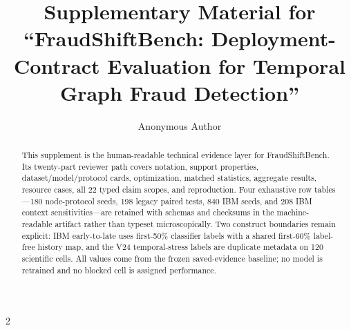 \documentclass[10pt,journal,onecolumn]{IEEEtran}
\begin{document}
\title{Supplementary Material for ``FraudShiftBench: Deployment-Contract Evaluation for Temporal Graph Fraud Detection''}
\author{Anonymous Author}
\maketitle
\pagestyle{plain}

\begin{abstract}
This supplement is the human-readable technical evidence layer for FraudShiftBench. Its twenty-part reviewer path covers notation, support properties, dataset/model/protocol cards, optimization, matched statistics, aggregate results, resource cases, all 22 typed claim scopes, and reproduction. Four exhaustive row tables---180 node-protocol seeds, 198 legacy paired tests, 840 IBM seeds, and 208 IBM context sensitivities---are retained with schemas and checksums in the machine-readable artifact rather than typeset microscopically. Two construct boundaries remain explicit: IBM early-to-late uses first-50\% classifier labels with a shared first-60\% label-free history map, and the V24 temporal-stress labels are duplicate metadata on 120 scientific cells. All values come from the frozen saved-evidence baseline; no model is retrained and no blocked cell is assigned performance.
\end{abstract}

\tableofcontents






















\raggedcolumns
\begin{multicols}{2}
  
  
\end{multicols}
\end{document}
